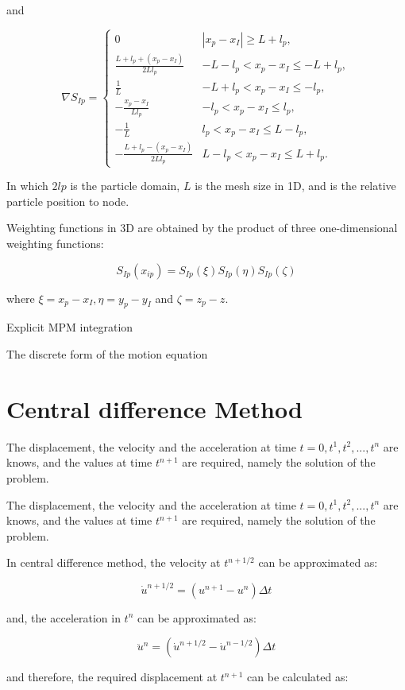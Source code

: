 \documentclass[11pt,a4paper]{article}
\begin{document}
and

$$
\nabla S_{I p}= \begin{cases}0 & \left|x_p-x_I\right| \geqslant L+l_p, 
\\ \frac{L+l_p+\left(x_p-x_I\right)}{2 L l_p} & -L-l_p<x_p-x_I \leqslant-L+l_p, 
\\ \frac{1}{L} & -L+l_p<x_p-x_I \leqslant-l_p, 
\\ -\frac{x_p-x_I}{L l_p} & -l_p<x_p-x_I \leqslant l_p, 
\\ -\frac{1}{L} & l_p<x_p-x_I \leqslant L-l_p, \\ -\frac{L+l_p-\left(x_p-x_I\right)}{2 L l_p} & L-l_p<x_p-x_I \leqslant L+l_p .\end{cases}
$$

In which  $ 2lp  $ is the particle domain,  $ L  $ is the mesh size in 1D, and  is the relative particle position to node.

Weighting functions in 3D are obtained by the product of three one-dimensional weighting functions:

$$ S_{I p}(x_{i p}) = S_{I p}(\xi) S_{I p} (\eta) S_{I p} (\zeta) $$

where $ \xi=x_p-x_I, \eta=y_p-y_I  $ and  $ \zeta=z_p-z $.

Explicit MPM integration

The discrete form of the motion equation

\section{Central difference Method}

The displacement, the velocity and the acceleration at time  $ t = 0, t^1, t^2, ... , t^n  $ are knows, and the values at time  $ t^{n+1}  $ are required, namely the solution of the problem.

The displacement, the velocity and the acceleration at time  $ t = 0, t^1, t^2, ... , t^n  $ are knows, and the values at time  $ t^{n+1}  $ are required, namely the solution of the problem.

In central difference method, the velocity at  $ t^{n+1/2}  $ can be approximated as:

$$ \dot{u}^{n+1/2} = ( u^{n+1} - u^{n} ) \Delta t $$

and, the acceleration in  $ t^{n}  $ can be approximated as:

$$ \ddot{u}^{n} =  (\dot{u}^{n+1/2} - \dot u ^ {n-1/2})\Delta t $$

and therefore, the required displacement at  $ t^{n+1}  $ can be calculated as:
\end{document}
